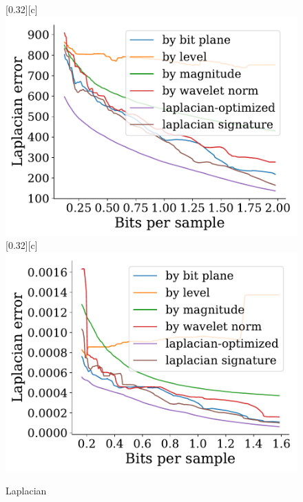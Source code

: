 \documentclass{article}
\begin{document}
\begin{figure}[htb]
        [0.32\linewidth][c]{%
               \includegraphics[width=0.3\linewidth]{img/supplementary/laplacian-optimized-foam}}
        [0.32\linewidth][c]{%
                \includegraphics[width=0.3\linewidth]{img/supplementary/laplacian-optimized-karfs}}
        \caption{Laplacian}
\end{figure}
\end{document}

